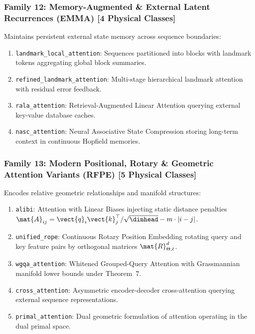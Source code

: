 \subsubsection{Family 12: Memory-Augmented \& External Latent Recurrences (EMMA) [4 Physical Classes]}
Maintains persistent external state memory across sequence boundaries:
\begin{enumerate}
    \item \texttt{landmark\_local\_attention}: Sequences partitioned into blocks with landmark tokens aggregating global block summaries.
    \item \texttt{refined\_landmark\_attention}: Multi-stage hierarchical landmark attention with residual error feedback.
    \item \texttt{rala\_attention}: Retrieval-Augmented Linear Attention querying external key-value database caches.
    \item \texttt{nasc\_attention}: Neural Associative State Compression storing long-term context in continuous Hopfield memories.
\end{enumerate}

\subsubsection{Family 13: Modern Positional, Rotary \& Geometric Attention Variants (RFPE) [5 Physical Classes]}
Encodes relative geometric relationships and manifold structures:
\begin{enumerate}
    \item \texttt{alibi}: Attention with Linear Biases injecting static distance penalties $\mat{A}_{ij} = \vect{q}_i \vect{k}_j^\top / \sqrt{\dimhead} - m \cdot |i - j|$.
    \item \texttt{unified\_rope}: Continuous Rotary Position Embedding rotating query and key feature pairs by orthogonal matrices $\mat{R}_{\Theta, t}^d$.
    \item \texttt{wgqa\_attention}: Whitened Grouped-Query Attention with Grassmannian manifold lower bounds under Theorem~7.
    \item \texttt{cross\_attention}: Asymmetric encoder-decoder cross-attention querying external sequence representations.
    \item \texttt{primal\_attention}: Dual geometric formulation of attention operating in the dual primal space.
\end{enumerate}

